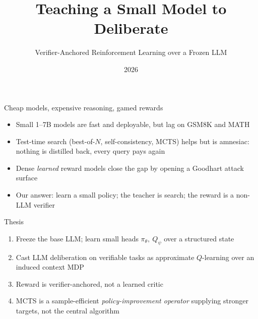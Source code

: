 \documentclass[aspectratio=169]{beamer}
\title{Teaching a Small Model to Deliberate}
\subtitle{Verifier-Anchored Reinforcement Learning over a Frozen LLM}
\date{2026}
\author{}
\newcommand{\pitheta}{\pi_\theta}
\newcommand{\Qpsi}{Q_\psi}
\begin{document}
\maketitle
{}

\begin{frame}{Cheap models, expensive reasoning, gamed rewards}
  \begin{itemize}
    \item Small 1--7B models are fast and deployable, but lag on GSM8K and MATH
    \item Test-time search (best-of-$N$, self-consistency, MCTS) helps but is \alert{amnesiac}: nothing is distilled back, every query pays again
    \item Dense \emph{learned} reward models close the gap by opening a Goodhart attack surface
    \item Our answer: learn a small policy; the teacher is search; the reward is a non-LLM verifier
  \end{itemize}
\end{frame}

\begin{frame}{Thesis}
  \begin{enumerate}
    \item Freeze the base LLM; learn small heads $\pitheta,\ \Qpsi$ over a structured state
    \item Cast LLM deliberation on verifiable tasks as \alert{approximate $Q$-learning over an induced context MDP}
    \item Reward is verifier-anchored, not a learned critic
    \item MCTS is a sample-efficient \emph{policy-improvement operator} supplying stronger targets, \alert{not} the central algorithm
  \end{enumerate}
\end{frame}
\end{document}
